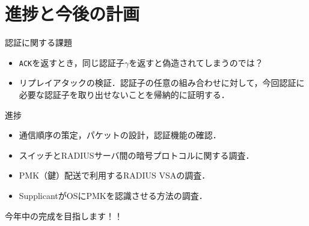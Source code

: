 \section{進捗と今後の計画}
\toc
\begin{frame}{\fft}
    \begin{alertblock}{認証に関する課題}
        \begin{itemize}
            \item[\cmark] \texttt{ACK}を返すとき，同じ認証子\(\gamma\)を返すと偽造されてしまうのでは？
            \item リプレイアタックの検証．認証子の任意の組み合わせに対して，今回認証に必要な認証子を取り出せないことを帰納的に証明する．
        \end{itemize}
    \end{alertblock}
    \vfill
    \begin{exampleblock}{進捗}
        \begin{itemize}
            \item[\cmark] 通信順序の策定，パケットの設計，認証機能の確認．
            \item スイッチとRADIUSサーバ間の暗号プロトコルに関する調査．
            \item PMK（鍵）配送で利用するRADIUS VSAの調査．
            \item SupplicantがOSにPMKを認識させる方法の調査．
        \end{itemize}
    \end{exampleblock}
    \hfill 今年中の完成を目指します！！
\end{frame}